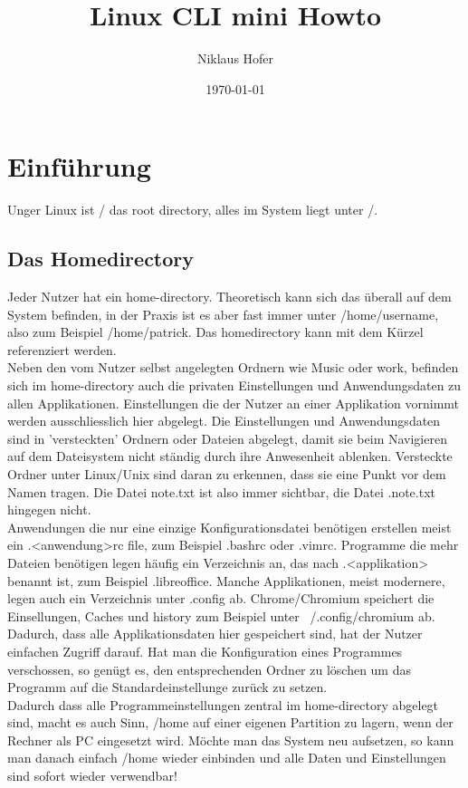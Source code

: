 \documentclass[10pt,paper=a4,final]{scrartcl}
\title{Linux CLI mini Howto}
\author{Niklaus Hofer}
\date{\today}
\begin{document}
\maketitle
\newpage
\flushleft
\tableofcontents
\newpage
\section{Einf\"uhrung}
Unger Linux ist / das root directory, alles im System liegt unter /.\\
\subsection{Das Homedirectory}
Jeder Nutzer hat ein home-directory. Theoretisch kann sich das \"uberall auf dem System befinden, in der Praxis ist es aber fast immer unter /home/username, also zum Beispiel /home/patrick. Das homedirectory kann mit dem K\"urzel ~ referenziert werden.\\
Neben den vom Nutzer selbst angelegten Ordnern wie Music oder work, befinden sich im home-directory auch die privaten Einstellungen und Anwendungsdaten zu allen Applikationen. Einstellungen die der Nutzer an einer Applikation vornimmt werden ausschliesslich hier abgelegt. Die Einstellungen und Anwendungsdaten sind in 'versteckten' Ordnern oder Dateien abgelegt, damit sie beim Navigieren auf dem Dateisystem nicht st\"andig durch ihre Anwesenheit ablenken. Versteckte Ordner unter Linux/Unix sind daran zu erkennen, dass sie eine Punkt vor dem Namen tragen. Die Datei note.txt ist also immer sichtbar, die Datei .note.txt hingegen nicht.\\
Anwendungen die nur eine einzige Konfigurationsdatei ben\"otigen erstellen meist ein .<anwendung>rc file, zum Beispiel .bashrc oder .vimrc. Programme die mehr Dateien ben\"otigen legen h\"aufig ein Verzeichnis an, das nach .<applikation> benannt ist, zum Beispiel .libreoffice. Manche Applikationen, meist modernere, legen auch ein Verzeichnis unter .config ab. Chrome/Chromium speichert die Einsellungen, Caches und history zum Beispiel unter ~/.config/chromium ab.\\
Dadurch, dass alle Applikationsdaten hier gespeichert sind, hat der Nutzer einfachen Zugriff darauf. Hat man die Konfiguration eines Programmes verschossen, so gen\"ugt es, den entsprechenden Ordner zu l\"oschen um das Programm auf die Standardeinstellunge zur\"uck zu setzen.\\
Dadurch dass alle Programmeinstellungen zentral im home-directory abgelegt sind, macht es auch Sinn, /home auf einer eigenen Partition zu lagern, wenn der Rechner als PC eingesetzt wird. M\"ochte man das System neu aufsetzen, so kann man danach einfach /home wieder einbinden und alle Daten und Einstellungen sind sofort wieder verwendbar!
\end{document}
